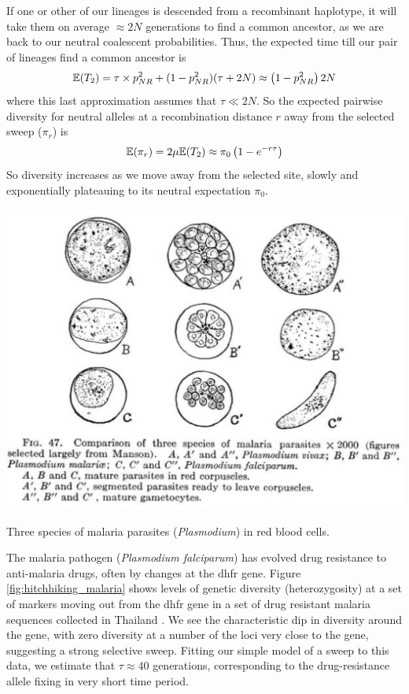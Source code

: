 If one or other of our lineages is descended from a recombinant haplotype, it will take them on average
$\approx 2N$ generations to find a common ancestor, as we are back to our
neutral coalescent probabilities. Thus, the expected time
till our pair of lineages find a common ancestor is
\begin{equation}
\mathbb{E}(T_2)  = \tau \times p_{NR}^2 +(1-p_{NR}^2) (\tau +2N) \approx
\left(1-p_{NR}^2 \right) 2N
\end{equation}
where this last approximation assumes that $\tau \ll 2N$. So the
expected pairwise diversity for neutral alleles at a recombination
distance $r$ away from the selected sweep ($\pi_r$) is
\begin{equation}
\mathbb{E}(\pi_r) = 2\mu \mathbb{E}(T_2)  \approx \pi_0 \left(1-e^{-r\tau} \right) \label{eqn:pi_HH}
\end{equation}
So diversity increases as we move away from the selected site,
slowly and exponentially plateauing to its neutral expectation $\pi_0$.\\
\begin{marginfigure}
\begin{center}
\includegraphics[width=\textwidth]{illustration_images/hitchhiking/malaria/malaria.png}
\end{center}
\caption{Three species of malaria parasites ({\it Plasmodium}) in red
  blood cells.  } \label{fig:malaria}
\end{marginfigure}
The malaria pathogen ({\it Plasmodium falciparum}) has
evolved drug resistance to anti-malaria drugs, often by changes at
the dhfr gene. Figure \ref{fig:hitchhiking_malaria} shows levels of
genetic diversity (heterozygosity) at a set of markers moving out from the dhfr gene in a
set of  drug resistant malaria sequences collected in
Thailand \citep{nash2005selection}. We see the characteristic dip in diversity around the gene,
with zero diversity at a number of the loci very close to the gene,
suggesting a strong selective sweep. Fitting our simple model of a
sweep to this data,  we estimate that $\tau \approx 40$ generations,
corresponding to the drug-resistance allele fixing in very short time period. 

